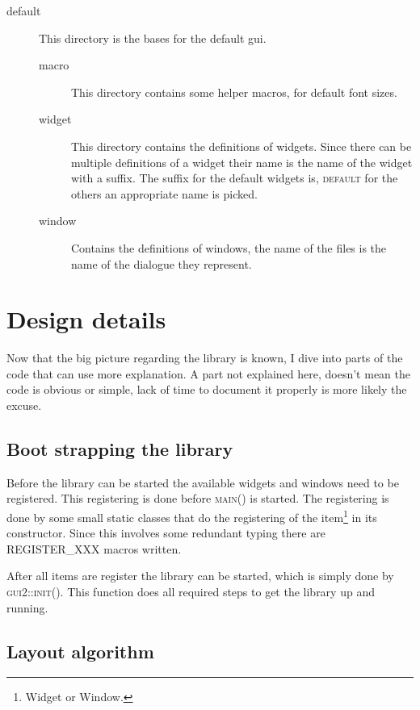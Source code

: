 \documentclass[a4paper,notitlepage,twocolumn,draft]{report}
\begin{document}
\begin{description}
\begin{description}
\item[default] This directory is the bases for the default gui.

\begin{description}
\item[macro] This directory contains some helper macros, for default font sizes.
\item[widget] This directory contains the definitions of widgets. Since there
	can be multiple definitions of a widget their name is the name of the widget
	with a suffix. The suffix for the default widgets is, \textsc{default} for
	the others an appropriate name is picked.
\item[window] Contains the definitions of windows, the name of the files is the
	name of the dialogue they represent.
\end{description}

\end{description}

\end{description}


\chapter{Design details}

Now that the big picture regarding the library is known, I dive into parts of
the code that can use more explanation. A part not explained here, doesn't mean
the code is obvious or simple, lack of time to document it properly is more
likely the excuse.

\section{Boot strapping the library}

Before the library can be started the available widgets and windows need to
be registered. This registering is done before \textsc{main()} is started.
The registering is done by some small static classes that do the registering
of the item\footnote{Widget or Window.} in its constructor. Since this
involves some redundant typing there are REGISTER\_XXX macros written.

After all items are register the library can be started, which is simply
done by \textsc{gui2::init()}. This function does all required steps to get
the library up and running.

\section{Layout algorithm}
\end{document}
